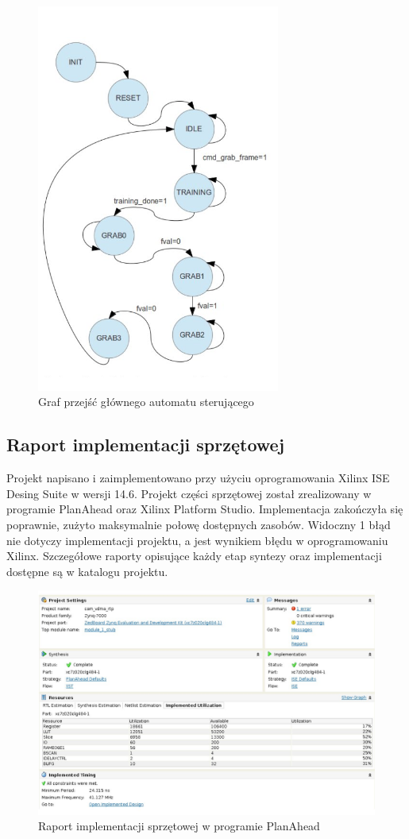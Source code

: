\documentclass[a4paper,11pt,oneside]{book}  %
\begin{document}
\begin{figure}[H]
	\centering
	\includegraphics[width=8cm]{data6.png}
	\caption{Graf przejść głównego automatu sterującego}
	\label{fig:Zynq6}
\end{figure}

\subsection{Raport implementacji sprzętowej}
Projekt napisano i zaimplementowano przy użyciu oprogramowania Xilinx ISE Desing Suite w wersji 14.6. Projekt części sprzętowej został zrealizowany w programie PlanAhead oraz Xilinx Platform Studio. Implementacja zakończyła się poprawnie, zużyto maksymalnie połowę dostępnych zasobów. Widoczny 1 błąd nie dotyczy implementacji projektu, a jest wynikiem błędu w oprogramowaniu Xilinx. Szczegółowe raporty opisujące każdy etap syntezy oraz implementacji dostępne są w katalogu projektu.

\begin{figure}[H]
	\centering
	\includegraphics[width=16cm]{data7.png}
	\caption{Raport implementacji sprzętowej w programie PlanAhead}
	\label{fig:Zynq7}
\end{figure}
\end{document}

